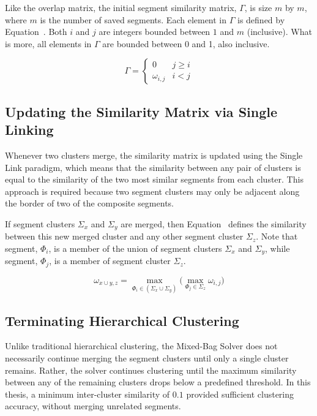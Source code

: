 Like the overlap matrix, the initial segment similarity matrix, $\Gamma$, is size $m$ by $m$, where $m$ is the number of saved segments.  Each element in $\Gamma$ is defined by Equation~.  Both $i$ and $j$ are integers bounded between $1$ and $m$ (inclusive).  What is more, all elements in $\Gamma$ are bounded between 0 and 1, also inclusive.

\begin{equation} \label{eq:similarityMatrix}
\Gamma = \begin{cases} 
	0 & j \geq i
\\
	\omega_{i,j} & i < j
\end{cases} 
\end{equation}

\subsection{Updating the Similarity Matrix via Single Linking}

Whenever two clusters merge, the similarity matrix is updated using the Single Link paradigm, which means that the similarity between any pair of clusters is equal to the similarity of the two most similar segments from each cluster.  This approach is required because two segment clusters may only be adjacent along the border of two of the composite segments.  

If segment clusters $\Sigma_x$ and $\Sigma_y$ are merged, then Equation~ defines the similarity between this new merged cluster and any other segment cluster $\Sigma_z$.  Note that segment, $\Phi_i$, is a member of the union of segment clusters $\Sigma_x$ and $\Sigma_y$, while segment, $\Phi_j$, is a member of segment cluster $\Sigma_z$.

\begin{equation} \label{eq:segmentClusterMerge}
	\omega_{x \cup y,z} = \max_{\Phi_i \in (\Sigma_x \cup \Sigma_y)} \bigg( \max_{\Phi_j \in \Sigma_z} \omega_{i,j} \bigg) 
\end{equation}

\subsection{Terminating Hierarchical Clustering}

Unlike traditional hierarchical clustering, the Mixed-Bag Solver does not necessarily continue merging the segment clusters  until only a single cluster remains. Rather, the solver continues clustering until the maximum similarity between any of the remaining clusters drops below a predefined threshold.  In this thesis, a minimum inter-cluster similarity of $0.1$ provided sufficient clustering accuracy, without merging unrelated segments.

